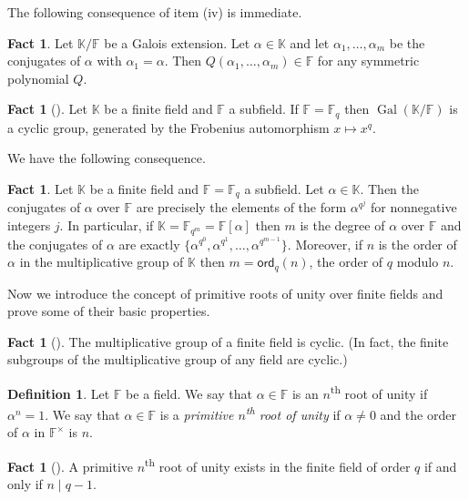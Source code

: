 \documentclass[11pt]{article}
\numberwithin{equation}{section}
\theoremstyle{definition}
\newtheorem{definition}[theorem]{Definition}
\theoremstyle{plain}
\theoremstyle{definition}
\newtheorem{fact.}[theorem]{Fact}
\newcommand\F{{\mathbb{F}}}
\newcommand\K{{\mathbb{K}}}
\newcommand\ord{\textsf{ord}}
\DeclareMathOperator{\Gal}{Gal}  %
\newcommand{\ts}{\textsuperscript}
\begin{document}
The following consequence of item (iv) is immediate.
\begin{fact.}\label{symmetric_poly}
Let $\K/\F$ be a Galois extension.
Let $\alpha \in \K$ and let $\alpha_1, \dots , \alpha_m$
be the conjugates of $\alpha$ with $\alpha_1 = \alpha$.  Then
$Q(\alpha_1, \dots , \alpha_m) \in \F$ for any symmetric polynomial $Q$.
\end{fact.}

%
%
%
%

\begin{fact.}[{\cite[Ch. V, Thm. 5.4]{lang}}]
\label{frobenius}
Let $\K$ be a finite field and $\F$ a subfield.  
If $\F = \F_q$ then $\Gal(\K/\F)$  
is a cyclic group, generated by the Frobenius automorphism
$x \mapsto x^q$. 
\end{fact.}

We have the following consequence.
\begin{fact.} \label{order1}
Let $\K$ be a finite field and $\F = \F_q$ a subfield.  Let $\alpha \in \K$.
Then the conjugates of $\alpha$ over $\F$ are precisely the  
elements of the form $\alpha^{q^j}$ for nonnegative integers $j$.
In particular, if $\K = \F_{q^m} = \F[\alpha]$ then $m$ is the degree
of $\alpha$ over $\F$ and the conjugates of $\alpha$ are exactly
$\{\alpha^{q^0}, \alpha^{q^1},  \dots,  \alpha^{q^{m-1}} \}$.  
Moreover, if $n$ is the order of $\alpha$ in the multiplicative group
of $\K$ then $m = \ord_q(n)$, the order of $q$ modulo $n$.
\end{fact.}

Now we introduce the concept of primitive 
roots of unity over finite fields and prove some
of their basic properties. 
\begin{fact.}[{\cite[Ch. V, Thm. 5.3]{lang}}]
The multiplicative group of a finite field is cyclic.
(In fact, the finite subgroups of the multiplicative group
of any field are cyclic.)
\end{fact.}

\begin{definition}
Let $\F$ be a field.  We say that $\alpha\in\F$ is an
$n$\ts{th} root of unity if $\alpha^n=1$.  We say that
$\alpha\in\F$ is a \emph{primitive $n$\ts{th} root of unity}
if $\alpha\neq 0$ and the order of $\alpha$ in
 $\F^{\times}$ is $n$.
\end{definition}

\begin{fact.}[{\cite[Thm. 2.47(ii)]{lidl}}]
A primitive $n$\ts{th} root of unity exists in the finite
field of order $q$ if and only if $n\mid q-1$.
\end{fact.}
\end{document}
